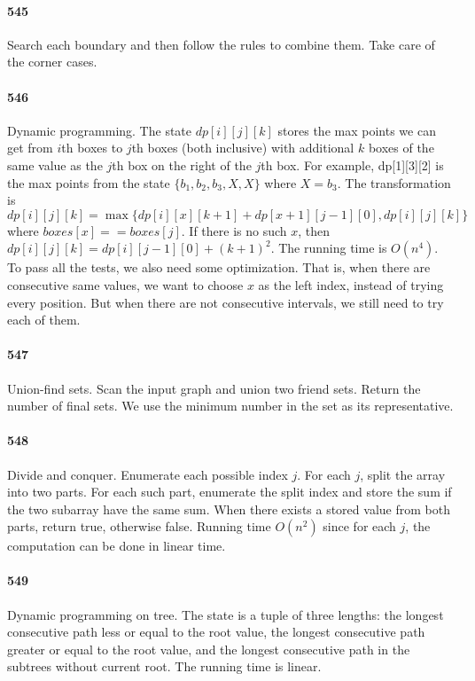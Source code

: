 \documentclass[11pt]{article}
\begin{document}
\paragraph{545}
Search each boundary and then follow the rules to combine them. Take care of the corner cases.

\paragraph{546}
Dynamic programming. The state $dp[i][j][k]$ stores the max points we can get from $i$th boxes to $j$th boxes (both inclusive) 
with additional $k$ boxes of the same value as the $j$th box on the right of the $j$th box. For example, dp[1][3][2] 
is the max points from the state $\{b_1, b_2, b_3, X, X \}$ where $X = b_3$. 
The transformation is $dp[i][j][k] = \max \{dp[i][x][k+1] + dp[x+1][j-1][0], dp[i][j][k] \}$ where $boxes[x] == boxes[j]$.
If there is no such $x$, then $dp[i][j][k] = dp[i][j-1][0] + (k+1)^2$.
The running time is $O(n^4)$. 
To pass all the tests, we also need some optimization. That is, when there are consecutive same values, we want to choose $x$
as the left index, instead of trying every position. But when there are not consecutive intervals, we still need to try each 
of them.

\paragraph{547}
Union-find sets. Scan the input graph and union two friend sets. Return the number of final sets. We use the minimum number
in the set as its representative. 


\paragraph{548}
Divide and conquer. Enumerate each possible index $j$. For each $j$, split the array into two parts. For each such part, 
enumerate the split index and store the sum if the two subarray have the same sum. When there exists a stored value 
from both parts, return true, otherwise false.
Running time $O(n^2)$ since for each $j$, the computation can be done in linear time.


\paragraph{549}
Dynamic programming on tree. The state is a tuple of three lengths: the longest consecutive path less or equal to the root 
value, the longest consecutive path greater or equal to the root value, and the longest consecutive path in the subtrees 
without current root. The running time is linear.
\end{document}
